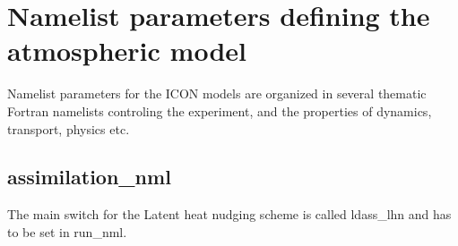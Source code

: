 
\section{Namelist parameters defining the atmospheric model}

Namelist parameters for the ICON models are organized in several thematic
Fortran namelists controling the experiment, and the properties of
dynamics, transport, physics etc.

\subsection{assimilation\_nml}

The main switch for the Latent heat nudging scheme is called ldass\_lhn and has to be set in run\_nml. 

